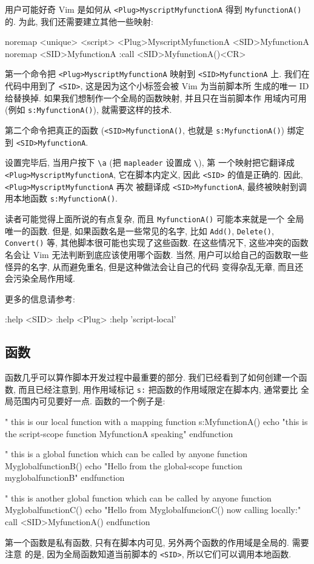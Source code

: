 用户可能好奇 Vim 是如何从 \texttt{<Plug>MyscriptMyfunctionA} 得到
\texttt{MyfunctionA()} 的. 为此, 我们还需要建立其他一些映射:
\begin{vimcode}
noremap <unique> <script> <Plug>MyscriptMyfunctionA <SID>MyfunctionA
noremap <SID>MyfunctionA :call <SID>MyfunctionA()<CR>
\end{vimcode}
第一个命令把 \texttt{<Plug>MyscriptMyfunctionA} 映射到 \texttt{<SID>MyfunctionA}
上. 我们在代码中用到了 \texttt{<SID>}, 这是因为这个小标签会被 Vim 为当前脚本所
生成的唯一 ID 给替换掉. 如果我们想制作一个全局的函数映射, 并且只在当前脚本作
用域内可用 (例如 \texttt{s:MyfunctionA()}), 就需要这样的技术.

第二个命令把真正的函数 (\texttt{<SID>MyfunctionA()}, 也就是
\texttt{s:MyfunctionA()}) 绑定到 \texttt{<SID>MyfunctionA}.

设置完毕后, 当用户按下 \verb'\a' (把 \texttt{mapleader} 设置成 \verb'\'), 第
一个映射把它翻译成 \texttt{<Plug>MyscriptMyfunctionA}, 它在脚本内定义, 因此
\texttt{<SID>} 的值是正确的. 因此, \texttt{<Plug>MyscriptMyfunctionA} 再次
被翻译成 \texttt{<SID>MyfunctionA}, 最终被映射到调用本地函数
\texttt{s:MyfunctionA()}.

读者可能觉得上面所说的有点复杂, 而且 \texttt{MyfunctionA()} 可能本来就是一个
全局唯一的函数. 但是, 如果函数名是一些常见的名字, 比如 \texttt{Add()},
\texttt{Delete()}, \texttt{Convert()} 等, 其他脚本很可能也实现了这些函数.
在这些情况下, 这些冲突的函数名会让 Vim 无法判断到底应该使用哪个函数. 当然,
用户可以给自己的函数取一些怪异的名字, 从而避免重名, 但是这种做法会让自己的代码
变得杂乱无章, 而且还会污染全局作用域.

\begin{warning}
更多的信息请参考:
\begin{vimcode}
:help <SID>
:help <Plug>
:help 'script-local'
\end{vimcode}
\end{warning}

\subsection{函数}
\label{subsec:functions}

函数几乎可以算作脚本开发过程中最重要的部分. 我们已经看到了如何创建一个函数,
而且已经注意到, 用作用域标记 \texttt{s:} 把函数的作用域限定在脚本内, 通常要比
全局范围内可见要好一点. 函数的一个例子是:
\begin{vimcode}
" this is our local function with a mapping
function s:MyfunctionA()
    echo "this is the script-scope function MyfunctionA speaking"
endfunction

" this is a global function which can be called by anyone
function MyglobalfunctionB()
    echo "Hello from the global-scope function myglobalfunctionB"
endfunction

" this is another global function which can be called by anyone
function MyglobalfunctionC()
    echo "Hello from MyglobalfuncionC() now calling locally:"
    call <SID>MyfunctionA()
endfunction
\end{vimcode}
第一个函数是私有函数, 只有在脚本内可见, 另外两个函数的作用域是全局的. 需要注意
的是, 因为全局函数知道当前脚本的 \texttt{<SID>}, 所以它们可以调用本地函数.

